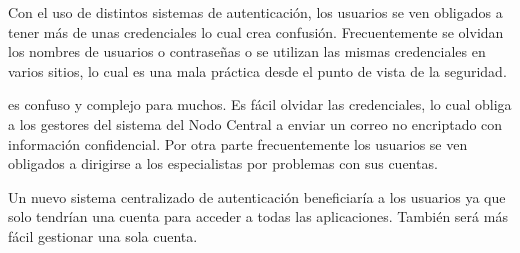 Con el uso de distintos sistemas de autenticación, los usuarios se ven obligados a tener más de unas credenciales lo cual crea confusión. Frecuentemente se olvidan los nombres de usuarios o contraseñas o se utilizan las mismas credenciales en varios sitios, lo cual es una mala práctica desde el punto de vista de la seguridad.


es confuso y complejo para muchos. Es fácil olvidar las credenciales, lo cual obliga a los gestores del sistema del Nodo Central a enviar un correo no encriptado con información confidencial. Por otra parte frecuentemente los usuarios se ven obligados a dirigirse a los especialistas por problemas con sus cuentas. 

Un nuevo sistema centralizado de autenticación beneficiaría a los usuarios ya que solo tendrían una cuenta para acceder a todas las aplicaciones. También será más fácil gestionar una sola cuenta.